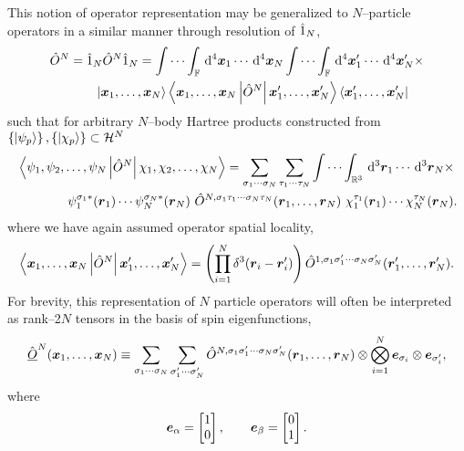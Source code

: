 This notion of operator representation may be generalized to $N$--particle operators in a similar manner through resolution of $\hat{1}_N$,
\begin{align}
  \hat{O}^N &= \hat{1}_N \hat{O}^N \hat{1}_N 
  = \idotsint_{\mathbb F}
    \,\mathrm{d}^4\boldsymbol{x}_1 \cdots   \,\mathrm{d}^4\boldsymbol{x}_N
    \idotsint_{\mathbb F}
    \,\mathrm{d}^4\boldsymbol{x}'_1 \cdots  \,\mathrm{d}^4\boldsymbol{x}'_N \times \nonumber\\
    &\qquad\left\vert \boldsymbol{x}_1,\ldots,\boldsymbol{x}_N \right\rangle \left\langle \boldsymbol{x}_1,\ldots,\boldsymbol{x}_N \left\vert \hat{O}^{N} \right\vert \boldsymbol{x}'_1,\ldots,\boldsymbol{x}'_N \right\rangle\left\langle \boldsymbol{x}'_1,\ldots,\boldsymbol{x}'_N \right\vert 
\end{align}
such that for arbitrary $N$--body Hartree products constructed from $\left \lbrace \left\vert \psi_p \right\rangle \right\rbrace,\left \lbrace \left\vert \chi_p \right\rangle \right\rbrace \subset \mathcal{H}^N$
\begin{align}
  \label{eq:SpinorOpInnerN}
  &\left\langle \psi_1,\psi_2,\ldots,\psi_N \left\vert \hat{O}^N \right\vert \chi_1,\chi_2,\ldots,\chi_N \right\rangle =  
  \sum_{\sigma_1\cdots\sigma_N}\sum_{\tau_1\cdots\tau_N} \idotsint_{\mathbb R^3} 
    \,\mathrm{d}^3\boldsymbol{r}_1\cdots\,\mathrm{d}^3\boldsymbol{r}_N  \nonumber \times \\ &\qquad \qquad
    \psi_1^{\sigma_1*}(\boldsymbol{r}_1) \cdots \psi_N^{\sigma_N*}(\boldsymbol{r}_N) ~ \hat{O}^{N,\sigma_1\tau_1\cdots\sigma_N\tau_N}(\boldsymbol{r}_1,\ldots,\boldsymbol{r}_N) ~ 
    \chi_1^{\tau_1}(\boldsymbol{r}_1) \cdots \chi_N^{\tau_N}(\boldsymbol{r}_N).
\end{align}
where we have again assumed operator spatial locality,
\begin{equation}
  \label{eq:LocalSpinorOpN}
  \left\langle \boldsymbol{x}_1,\ldots,\boldsymbol{x}_N \left\vert \hat{O}^{N} \right\vert \boldsymbol{x}'_1,\ldots,\boldsymbol{x}'_N \right\rangle = 
    \left(\prod_{i=1}^N\delta^3(\boldsymbol{r}_i - \boldsymbol{r}'_i)\right) 
    \hat{O}^{1,\sigma_1\sigma_1'\cdots\sigma_N\sigma_N'}(\boldsymbol{r}_1',\ldots,\boldsymbol{r}_N').
\end{equation}
For brevity, this representation of $N$ particle operators will 
often be interpreted as rank--2$N$ tensors in the basis of spin eigenfunctions, 
\begin{equation}
\label{eq:SpinorOpN}
\hat{\underline{O}}^N (\boldsymbol{x}_1,\ldots,\boldsymbol{x}_N) \equiv \sum_{\sigma_1\cdots\sigma_N}\sum_{\sigma'_1\cdots\sigma'_N}  \hat{O}^{N,\sigma_1\sigma_1'\cdots\sigma_N\sigma_N'}(\boldsymbol{r}_1,\ldots,\boldsymbol{r}_N) 
  \otimes \bigotimes_{i=1}^N \boldsymbol{e}_{\sigma_i} \otimes \boldsymbol{e}_{\sigma_i'}, 
\end{equation}
where 
\begin{align}
\boldsymbol{e}_\alpha = \begin{bmatrix} 1 \\ 0 \end{bmatrix}, \qquad \boldsymbol{e}_\beta = \begin{bmatrix} 0 \\ 1 \end{bmatrix}. 
\end{align}
